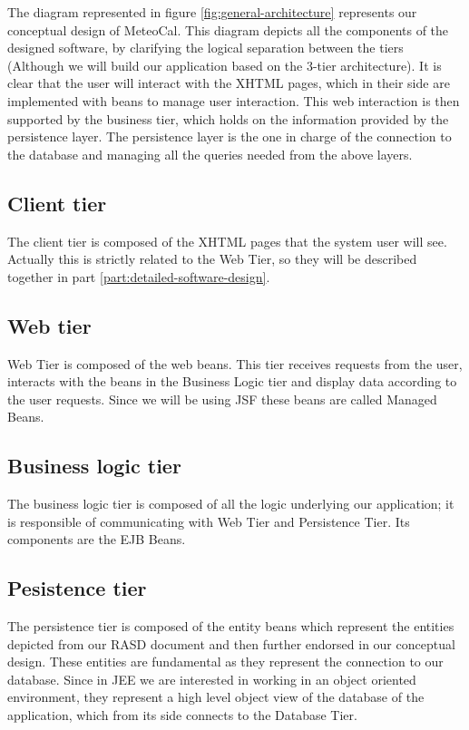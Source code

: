 \documentclass[10pt,a4paper,titlepage]{article}
\begin{document}
The diagram represented in figure \ref{fig:general-architecture} represents our conceptual design of MeteoCal. This diagram depicts all the components of the designed software, by clarifying the logical separation between the tiers (Although we will build our application based on the 3-tier architecture).
It is clear that the user will interact with the XHTML pages, which in their side are implemented with beans to manage user interaction. This web interaction is then supported by the business tier, which holds on the information provided by the persistence layer. The persistence layer is the one in charge of the connection to the database and managing all the queries needed from the above layers.

\subsection{Client tier}
The client tier is composed of the XHTML pages that the system user will see. Actually this is strictly related to the Web Tier, so they will be described together in part \ref{part:detailed-software-design}.

\subsection{Web tier}
Web Tier is composed of the web beans. This tier receives requests from the user, interacts with the beans in the Business Logic tier and display data according to the user requests. Since we will be using JSF these beans are called Managed Beans.

\subsection{Business logic tier}
The business logic tier is composed of all the logic underlying our application; it is responsible of communicating with Web Tier and Persistence Tier. Its components are the EJB Beans.

\subsection{Pesistence tier}
The persistence tier is composed of the entity beans which represent the entities depicted from our RASD document and then further endorsed in our conceptual design. These entities are fundamental as they represent the connection to our database. Since in JEE we are interested in working in an object oriented environment, they represent a high level object view of the database of the application, which from its side connects to the Database Tier.
\end{document}
